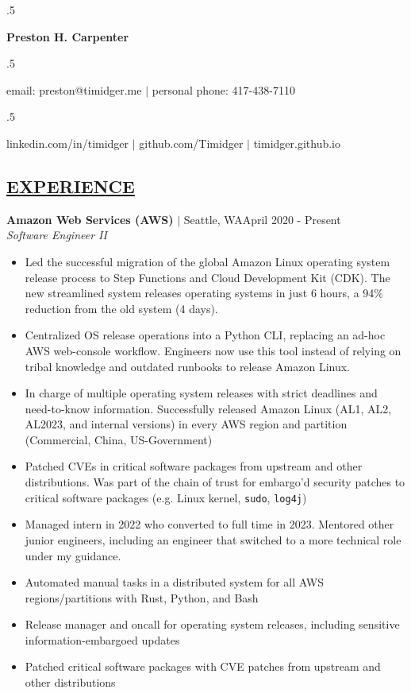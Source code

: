 \documentclass[overlapped,line]{res}
\begin{document}
\moveleft.5\hoffset\centerline{\huge\bf Preston H. Carpenter}
\vspace{.2em}

\moveleft.5\hoffset\centerline{email: preston@timidger.me $|$ personal phone: 417-438-7110}
\moveleft.5\hoffset\centerline{linkedin.com/in/timidger $|$ github.com/Timidger $|$ timidger.github.io }
\vspace{1em}

\begin{resume}

\section{\underline{EXPERIENCE}}

\textbf{Amazon Web Services (AWS)} $|$ Seattle, WA\hfill April 2020 - Present\\
{\sl Software Engineer II}
\begin{itemize} \itemsep -2pt
	\item Led the successful migration of the global Amazon Linux
		operating system release process to Step Functions and Cloud Development Kit
		(CDK). The new streamlined system releases operating systems in
		just 6 hours, a 94\% reduction from the old system (4 days).
	\item Centralized OS release operations into a
		Python CLI, replacing an ad-hoc AWS web-console workflow.
		Engineers now use this tool instead of relying on tribal knowledge
		and outdated runbooks to release Amazon Linux.
	\item In charge of multiple operating system releases with strict
		deadlines and need-to-know information. Successfully released
		Amazon Linux (AL1, AL2, AL2023, and internal
		versions) in every AWS region and partition (Commercial, China, US-Government)
	\item Patched CVEs in critical software packages from upstream and other
		distributions. Was part of the chain of trust for embargo'd
		security patches to critical software packages (e.g.
		Linux kernel, \texttt{sudo}, \texttt{log4j})
	\item Managed intern in 2022 who converted to full time in 2023.
		Mentored other junior engineers, including an engineer that
		switched to a more technical role under my guidance.
	\item Automated manual tasks in a distributed
		system for all AWS regions/partitions with
		Rust, Python, and Bash
	\item Release manager and oncall for operating system releases,
		including sensitive information-embargoed updates
	\item Patched critical software packages with CVE patches from
		upstream and other distributions
\end{itemize}


\end{resume}
\end{document}

